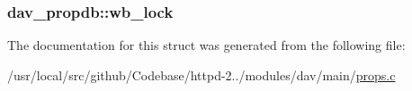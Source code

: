 \subsubsection[{\texorpdfstring{wb\+\_\+lock}{wb_lock}}]{ dav\+\_\+propdb\+::wb\+\_\+lock}\hypertarget{structdav__propdb_ae8338e47ac1fa8762b2f8b2bfcd022fe}{}\label{structdav__propdb_ae8338e47ac1fa8762b2f8b2bfcd022fe}


The documentation for this struct was generated from the following file\+:\begin{DoxyCompactItemize}
\item 
/usr/local/src/github/\+Codebase/httpd-\/2../modules/dav/main/\hyperlink{props_8c}{props.\+c}\end{DoxyCompactItemize}
